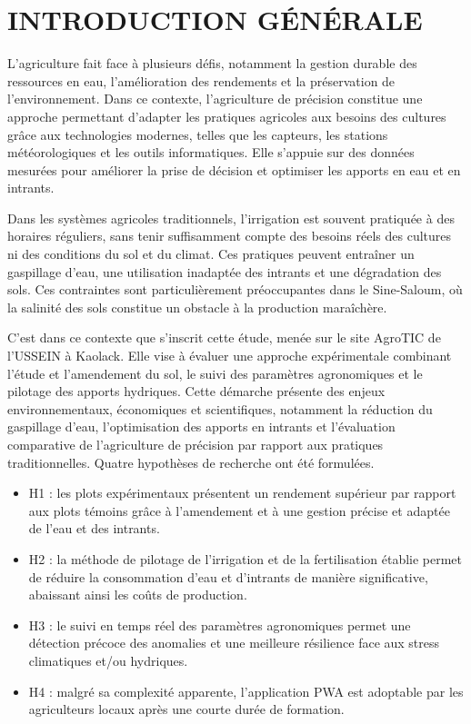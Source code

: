 \chapter*{INTRODUCTION GÉNÉRALE}
L’agriculture fait face à plusieurs défis, notamment la gestion durable des ressources en eau, l’amélioration des rendements et la préservation de l’environnement. Dans ce contexte, l’agriculture de précision constitue une approche permettant d’adapter les pratiques agricoles aux besoins des cultures grâce aux technologies modernes, telles que les capteurs, les stations météorologiques et les outils informatiques. Elle s’appuie sur des données mesurées pour améliorer la prise de décision et optimiser les apports en eau et en intrants.

Dans les systèmes agricoles traditionnels, l’irrigation est souvent pratiquée à des horaires réguliers, sans tenir suffisamment compte des besoins réels des cultures ni des conditions du sol et du climat. Ces pratiques peuvent entraîner un gaspillage d’eau, une utilisation inadaptée des intrants et une dégradation des sols. Ces contraintes sont particulièrement préoccupantes dans le Sine-Saloum, où la salinité des sols constitue un obstacle à la production maraîchère.

C’est dans ce contexte que s’inscrit cette étude, menée sur le site AgroTIC de l’USSEIN à Kaolack. Elle vise à évaluer une approche expérimentale combinant l’étude et l’amendement du sol, le suivi des paramètres agronomiques et le pilotage des apports hydriques. Cette démarche présente des enjeux environnementaux, économiques et scientifiques, notamment la réduction du gaspillage d’eau, l’optimisation des apports en intrants et l’évaluation comparative de l’agriculture de précision par rapport aux pratiques traditionnelles.
Quatre hypothèses de recherche ont été formulées.

\begin{itemize}[label=$\bullet$]
   	 \item H1 : les plots expérimentaux présentent un rendement supérieur par rapport aux plots témoins grâce à l’amendement et à une gestion précise et adaptée de l’eau et des intrants.
     
     \item H2 : la méthode de pilotage de l’irrigation et de la fertilisation établie permet de réduire la consommation d’eau et d’intrants de manière significative, abaissant ainsi les coûts de production.

     \item H3 : le suivi en temps réel des paramètres agronomiques permet une détection précoce des anomalies et une meilleure résilience face aux stress climatiques et/ou hydriques.

     \item H4 : malgré sa complexité apparente, l’application PWA est adoptable par les agriculteurs locaux après une courte durée de formation.
	\end{itemize}

